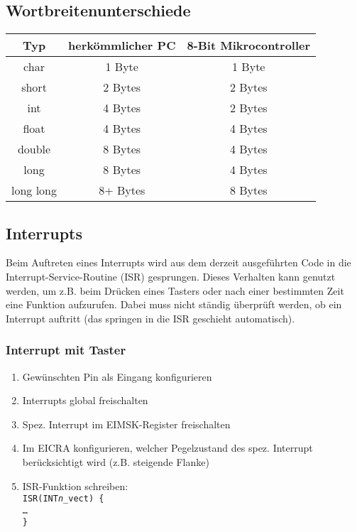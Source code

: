 \documentclass[german, threecolumn, 8pt]{latex4ei/latex4ei_sheet}
\begin{document}
\subsection{Wortbreitenunterschiede}
\begin{tabular}{c|c|c}
Typ & herkömmlicher PC & 8-Bit Mikrocontroller \\ \hline
char & 1 Byte & 1 Byte\\
short & 2 Bytes & 2 Bytes \\
int & 4 Bytes & 2 Bytes  \\
float & 4 Bytes & 4 Bytes  \\
double & 8 Bytes & 4 Bytes  \\
long & 8 Bytes & 4 Bytes \\
long long & 8+ Bytes & 8 Bytes  
\end{tabular}

\begin{minipage}{\columnwidth}
\subsection{Interrupts}
Beim Auftreten eines Interrupts wird aus dem derzeit ausgeführten Code in die Interrupt-Service-Routine (ISR) gesprungen. Dieses Verhalten kann genutzt werden, um z.B. beim Drücken eines Tasters oder nach einer bestimmten Zeit eine Funktion aufzurufen. Dabei muss nicht ständig überprüft werden, ob ein Interrupt auftritt (das springen in die ISR geschieht automatisch).
\end{minipage}
\subsubsection{Interrupt mit Taster}
\begin{enumerate}
\item Gewünschten Pin als Eingang konfigurieren
\item Interrupts global freischalten
\item Spez. Interrupt im EIMSK-Register freischalten
\item Im EICRA konfigurieren, welcher Pegelzustand des spez. Interrupt berücksichtigt wird (z.B. steigende Flanke)
\item ISR-Funktion schreiben: \\
\texttt{ISR(INT\textit{n}\_vect) \{ \\ \dots \\ \} }
\end{enumerate}
\end{document}
